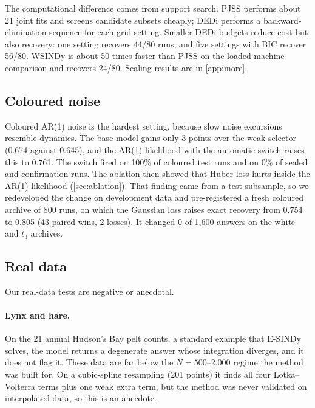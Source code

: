 The computational difference comes from support search. PJSS performs about 21 joint fits and screens candidate subsets cheaply; DEDi performs a backward-elimination sequence for each grid setting. Smaller DEDi budgets reduce cost but also recovery: one setting recovers 44/80 runs, and five settings with BIC recover 56/80. WSINDy is about 50 times faster than PJSS on the loaded-machine comparison and recovers 24/80. Scaling results are in \cref{app:more}.

\subsection{Coloured noise}
\label{sec:noise}
Coloured AR(1) noise is the hardest setting, because slow noise excursions resemble dynamics. The base model gains only 3 points over the weak selector (0.674 against 0.645), and the AR(1) likelihood with the automatic switch raises this to 0.761. The switch fired on 100\% of coloured test runs and on 0\% of sealed and confirmation runs. The ablation then showed that Huber loss hurts inside the AR(1) likelihood (\cref{sec:ablation}). That finding came from a test subsample, so we redeveloped the change on development data and pre-registered a fresh coloured archive of 800 runs, on which the Gaussian loss raises exact recovery from 0.754 to 0.805 (43 paired wins, 2 losses). It changed 0 of 1{,}600 answers on the white and $t_3$ archives.

\subsection{Real data}
\label{sec:realdata}
Our real-data tests are negative or anecdotal.

\paragraph{Lynx and hare.} On the 21 annual Hudson's Bay pelt counts, a standard example that E-SINDy~\citep{fasel2022esindy} solves, the model returns a degenerate answer whose integration diverges, and it does not flag it. These data are far below the $N=500$--2{,}000 regime the method was built for. On a cubic-spline resampling (201 points) it finds all four Lotka--Volterra terms plus one weak extra term, but the method was never validated on interpolated data, so this is an anecdote.

